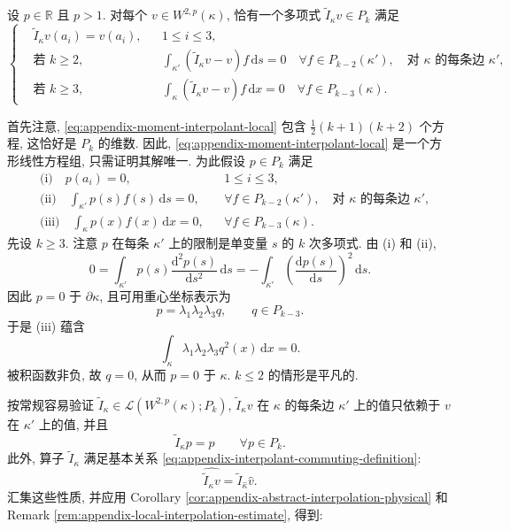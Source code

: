 \setcounter{statement}{2}
\begin{Lemma}\label{lem:appendix-moment-interpolant-local}
设 $p\in\mathbb{R}$ 且 $p>1$.
对每个 $v\in W^{2,p}(\kappa)$, 恰有一个多项式
$\widetilde I_\kappa v\in P_k$ 满足
\begin{equation}\label{eq:appendix-moment-interpolant-local}
\left\{
\begin{aligned}
&\widetilde I_\kappa v(a_i)=v(a_i),
&&1\leq i\leq3,\\
&\text{若 }k\geq2,
&&\int_{\kappa'}(\widetilde I_\kappa v-v)f\,\mathrm{d}s=0
\quad
\forall f\in P_{k-2}(\kappa'),
\quad
\text{对 $\kappa$ 的每条边 $\kappa'$},\\
&\text{若 }k\geq3,
&&\int_\kappa(\widetilde I_\kappa v-v)f\,\mathrm{d}x=0
\quad
\forall f\in P_{k-3}(\kappa).
\end{aligned}
\right.
\end{equation}
\end{Lemma}
\begin{Proof}
首先注意, \eqref{eq:appendix-moment-interpolant-local} 包含
$\frac12(k+1)(k+2)$ 个方程, 这恰好是 $P_k$ 的维数.
因此, \eqref{eq:appendix-moment-interpolant-local} 是一个方形线性方程组,
只需证明其解唯一. 为此假设 $p\in P_k$ 满足
\begin{align*}
&\text{(i)}\quad p(a_i)=0,
&&1\leq i\leq3,\\
&\text{(ii)}\quad
\int_{\kappa'}p(s)f(s)\,\mathrm{d}s=0,
&&\forall f\in P_{k-2}(\kappa'),
\quad\text{对 $\kappa$ 的每条边 $\kappa'$},\\
&\text{(iii)}\quad
\int_\kappa p(x)f(x)\,\mathrm{d}x=0,
&&\forall f\in P_{k-3}(\kappa).
\end{align*}
先设 $k\geq3$. 注意 $p$ 在每条 $\kappa'$ 上的限制是单变量 $s$
的 $k$ 次多项式. 由 (i) 和 (ii),
\[
0
=
\int_{\kappa'}p(s)\frac{\mathrm{d}^2p(s)}{\mathrm{d}s^2}\,\mathrm{d}s
=
-\int_{\kappa'}
\left(\frac{\mathrm{d}p(s)}{\mathrm{d}s}\right)^2\,\mathrm{d}s.
\]
因此 $p=0$ 于 $\partial\kappa$, 且可用重心坐标表示为
\[
p=\lambda_1\lambda_2\lambda_3q,
\qquad
q\in P_{k-3}.
\]
于是 (iii) 蕴含
\[
\int_\kappa\lambda_1\lambda_2\lambda_3q^2(x)\,\mathrm{d}x=0.
\]
被积函数非负, 故 $q=0$, 从而 $p=0$ 于 $\kappa$.
$k\leq2$ 的情形是平凡的.
\end{Proof}

按常规容易验证
$\widetilde I_\kappa\in\mathcal{L}(W^{2,p}(\kappa);P_k)$,
$\widetilde I_\kappa v$ 在 $\kappa$ 的每条边 $\kappa'$ 上的值只依赖于
$v$ 在 $\kappa'$ 上的值, 并且
\[
\widetilde I_\kappa p=p
\qquad
\forall p\in P_k.
\]
此外, 算子 $\widetilde I_\kappa$ 满足基本关系
\eqref{eq:appendix-interpolant-commuting-definition}:
\[
\widehat{\widetilde I_\kappa v}
=
\widetilde I_{\hat\kappa}\hat v.
\]
汇集这些性质, 并应用 Corollary
\ref{cor:appendix-abstract-interpolation-physical} 和 Remark
\ref{rem:appendix-local-interpolation-estimate}, 得到:

